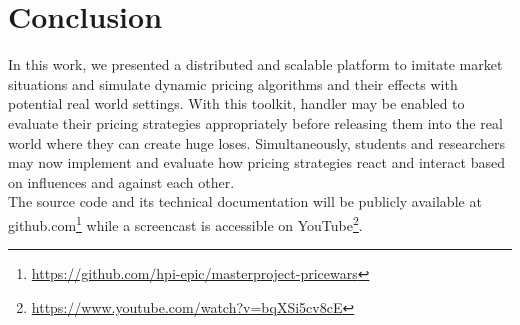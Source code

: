 \section{Conclusion}
\label{sec:conclusion}
%
In this work, we presented a distributed and scalable platform to imitate market situations and simulate dynamic pricing algorithms and their effects with potential real world settings. With this toolkit, handler may be enabled to evaluate their pricing strategies appropriately before releasing them into the real world where they can create huge loses. Simultaneously, students and researchers may now implement and evaluate how pricing strategies react and interact based on influences and against each other.\\

The source code and its technical documentation will be publicly available at github.com\footnote{\url{https://github.com/hpi-epic/masterproject-pricewars}}
while a screencast is accessible on YouTube\footnote{\url{https://www.youtube.com/watch?v=bqXSi5cv8cE}}.
